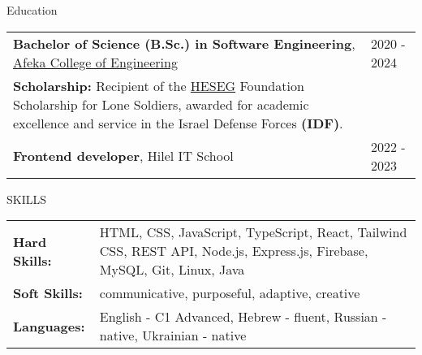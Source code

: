 \documentclass{resume}
\begin{document}

 \begin{rSection}{Education}

  \begin{tabular}{@{}p{}p{}}
  {\bf Bachelor of Science (B.Sc.) in Software Engineering}, \href{https://www.afeka.ac.il/}{Afeka College of Engineering} & \hfill 2020 - 2024\hspace*{1em} \\
  \textbf{Scholarship:} Recipient of the \href{https://www.heseg.com/}{HESEG} Foundation Scholarship for Lone Soldiers, awarded for academic excellence and service in the Israel Defense Forces \textbf{(IDF)}. & \hfill \\
  \vspace{0.5em}
  {\bf Frontend developer}, Hilel IT School & \hfill 2022 - 2023\hspace*{1em} \\
  \end{tabular}
 \end{rSection}

 \begin{rSection}{SKILLS}
  \begin{tabularx}{\textwidth}{@{}>{\bfseries}l X@{}}
   Hard Skills: & HTML, CSS, JavaScript, TypeScript, React, Tailwind CSS, REST API, Node.js, Express.js, Firebase, MySQL, Git, Linux, Java \\
   Soft Skills: & communicative, purposeful, adaptive, creative\\
   Languages: & English - C1 Advanced, Hebrew - fluent, Russian - native, Ukrainian - native
  \end{tabularx}

 \end{rSection}

\end{document}
